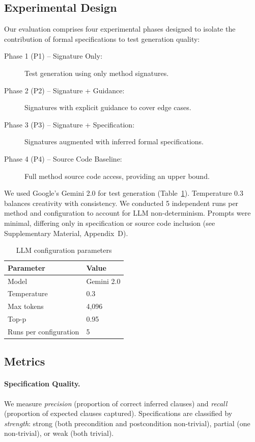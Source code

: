 \subsection{Experimental Design}

Our evaluation comprises four experimental phases designed to isolate the contribution of formal specifications to test generation quality:

\begin{description}
    \item[Phase 1 (P1) -- Signature Only:] Test generation using only method signatures.
    \item[Phase 2 (P2) -- Signature + Guidance:] Signatures with explicit guidance to cover edge cases.
    \item[Phase 3 (P3) -- Signature + Specification:] Signatures augmented with inferred formal specifications.
    \item[Phase 4 (P4) -- Source Code Baseline:] Full method source code access, providing an upper bound.
\end{description}

We used Google's Gemini 2.0 for test generation (Table~\ref{tab:llm-config}). Temperature 0.3 balances creativity with consistency. We conducted 5 independent runs per method and configuration to account for LLM non-determinism. Prompts were minimal, differing only in specification or source code inclusion (see Supplementary Material, Appendix~D).

\begin{table}[ht]
\centering
\caption{LLM configuration parameters}
\label{tab:llm-config}
\begin{tabular}{ll}
\toprule
\textbf{Parameter} & \textbf{Value} \\
\midrule
Model & Gemini 2.0 \\
Temperature & 0.3 \\
Max tokens & 4,096 \\
Top-p & 0.95 \\
Runs per configuration & 5 \\
\bottomrule
\end{tabular}
\end{table}

\subsection{Metrics}

\paragraph{Specification Quality.}
We measure \emph{precision} (proportion of correct inferred clauses) and \emph{recall} (proportion of expected clauses captured). Specifications are classified by \emph{strength}: strong (both precondition and postcondition non-trivial), partial (one non-trivial), or weak (both trivial).


